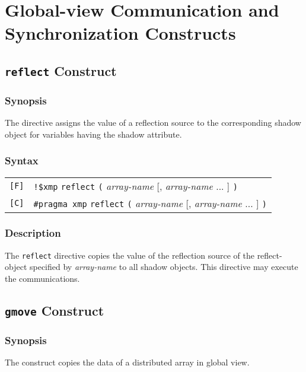 \section{Global-view Communication and Synchronization Constructs}

\subsection{{\tt reflect} Construct}

\subsubsection*{Synopsis}

The {\tt {}} directive assigns the value of a
reflection source to the corresponding shadow object for variables
having the shadow attribute. 

\subsubsection*{Syntax}

\begin{tabular}{ll}
\verb![F]! & \verb|!$xmp| {\tt reflect} \verb|(| {\it array-name} [,
 {\it array-name} ... ] \verb|)| \\
\verb![C]! & \verb|#pragma xmp| {\tt reflect} \verb|(| {\it array-name}
     [, {\it array-name} ... ] \verb|)| \\
\end{tabular}

\subsubsection*{Description}

The {\tt reflect} directive copies the value of
the reflection source of the reflect-object specified by {\it array-name} to all
shadow objects. This directive may execute the communications.

\subsection{{\tt gmove} Construct}
\subsubsection*{Synopsis}

The {\tt {}} construct copies the data of a
distributed array in global view. 

